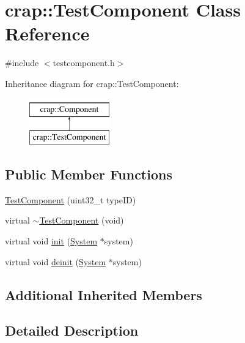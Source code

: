 \hypertarget{classcrap_1_1_test_component}{}\section{crap\+:\+:Test\+Component Class Reference}
\label{classcrap_1_1_test_component}


{\ttfamily \#include $<$testcomponent.\+h$>$}

Inheritance diagram for crap\+:\+:Test\+Component\+:\begin{figure}[H]
\begin{center}
\leavevmode
\includegraphics[height=2.000000cm]{classcrap_1_1_test_component}
\end{center}
\end{figure}
\subsection*{Public Member Functions}
\begin{DoxyCompactItemize}
\item 
\hyperlink{classcrap_1_1_test_component_ab9589f493cb73c508ec34d6ee3f3056e}{Test\+Component} (uint32\+\_\+t type\+I\+D)
\item 
virtual \hyperlink{classcrap_1_1_test_component_a1ef1753e436a0c42901815c45ed3fa7e}{$\sim$\+Test\+Component} (void)
\item 
virtual void \hyperlink{classcrap_1_1_test_component_a5a3de2b12286abb75938a25be41fabec}{init} (\hyperlink{classcrap_1_1_system}{System} $\ast$system)
\item 
virtual void \hyperlink{classcrap_1_1_test_component_acf4c0fa2f9082188eb45a9c62672f2a5}{deinit} (\hyperlink{classcrap_1_1_system}{System} $\ast$system)
\end{DoxyCompactItemize}
\subsection*{Additional Inherited Members}


\subsection{Detailed Description}


